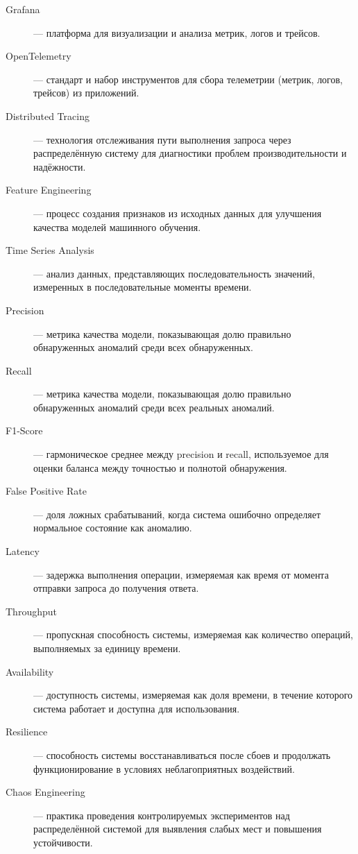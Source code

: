 \begin{sloppypar}
\begin{description}
    \item[Grafana] — платформа для визуализации и анализа метрик, логов и трейсов.
    
    \item[OpenTelemetry] — стандарт и набор инструментов для сбора телеметрии (метрик, логов, трейсов) из приложений.
    
    \item[Distributed Tracing] — технология отслеживания пути выполнения запроса через распределённую систему для диагностики проблем производительности и надёжности.
    
    \item[Feature Engineering] — процесс создания признаков из исходных данных для улучшения качества моделей машинного обучения.
    
    \item[Time Series Analysis] — анализ данных, представляющих последовательность значений, измеренных в последовательные моменты времени.
    
    \item[Precision] — метрика качества модели, показывающая долю правильно обнаруженных аномалий среди всех обнаруженных.
    
    \item[Recall] — метрика качества модели, показывающая долю правильно обнаруженных аномалий среди всех реальных аномалий.
    
    \item[F1-Score] — гармоническое среднее между precision и recall, используемое для оценки баланса между точностью и полнотой обнаружения.
    
    \item[False Positive Rate] — доля ложных срабатываний, когда система ошибочно определяет нормальное состояние как аномалию.
    
    \item[Latency] — задержка выполнения операции, измеряемая как время от момента отправки запроса до получения ответа.
    
    \item[Throughput] — пропускная способность системы, измеряемая как количество операций, выполняемых за единицу времени.
    
    \item[Availability] — доступность системы, измеряемая как доля времени, в течение которого система работает и доступна для использования.
    
    \item[Resilience] — способность системы восстанавливаться после сбоев и продолжать функционирование в условиях неблагоприятных воздействий.
    
    \item[Chaos Engineering] — практика проведения контролируемых экспериментов над распределённой системой для выявления слабых мест и повышения устойчивости.
\end{description}
\end{sloppypar}

\newpage
